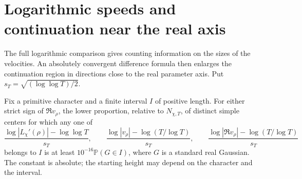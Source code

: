 \section{Logarithmic speeds and continuation near the real axis}
\label{sec:common-regions}
The full logarithmic comparison gives counting information on the
sizes of the velocities. An absolutely convergent difference formula
then enlarges the continuation region in directions close to the real
parameter axis. Put $s_T=\sqrt{(\log\log T)/2}$.

\begin{theorem}\label{thm:gaussian-speed-component}
Fix a primitive character and a finite interval $I$ of positive length.
For either strict sign of $\Re v_\rho$, the lower proportion, relative
to $N_{\chi,T}$, of distinct simple centers for which any one of
\[
 \frac{\log|L_\chi'(\rho)|-\log\log T}{s_T},\qquad
 \frac{\log|v_\rho|-\log(T/\log T)}{s_T},\qquad
 \frac{\log|\Re v_\rho|-\log(T/\log T)}{s_T}
\]
belongs to $I$ is at least $10^{-16}\mathbb P(G\in I)$, where
$G$ is a standard real Gaussian. The constant is absolute; the
starting height may depend on the character and the interval.
\end{theorem}


